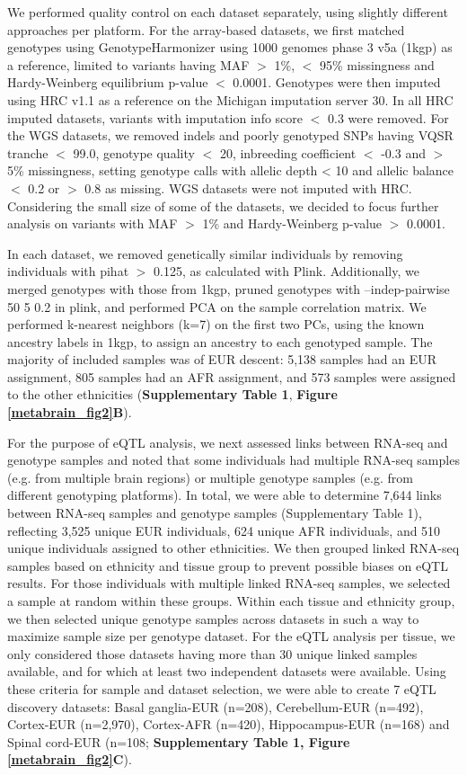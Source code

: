 We performed quality control on each dataset separately, using slightly different approaches per platform. For the array-based datasets, we first matched genotypes using GenotypeHarmonizer\cite{deelenGenotypeHarmonizerAutomatic2014} using 1000 genomes phase 3 v5a (1kgp) as a reference, limited to variants having MAF $>$ 1\%, $<$ 95\% missingness and Hardy-Weinberg equilibrium p-value $<$ 0.0001. Genotypes were then imputed using HRC v1.1 as a reference on the Michigan imputation server 30. In all HRC imputed datasets, variants with imputation info score $<$ 0.3 were removed. For the WGS datasets, we removed indels and poorly genotyped SNPs having VQSR tranche $<$ 99.0, genotype quality $<$ 20, inbreeding coefficient $<$ -0.3 and $>$ 5\% missingness, setting genotype calls with allelic depth < 10 and allelic balance $<$ 0.2 or $>$ 0.8 as missing. WGS datasets were not imputed with HRC. Considering the small size of some of the datasets, we decided to focus further analysis on variants with MAF $>$ 1\% and Hardy-Weinberg p-value $>$ 0.0001. 

In each dataset, we removed genetically similar individuals by removing individuals with pihat $>$ 0.125, as calculated with Plink. Additionally, we merged genotypes with those from 1kgp, pruned genotypes with --indep-pairwise 50 5 0.2 in plink, and performed PCA on the sample correlation matrix. We performed k-nearest neighbors (k=7) on the first two PCs, using the known ancestry labels in 1kgp, to assign an ancestry to each genotyped sample. The majority of included samples was of EUR descent: 5,138 samples had an EUR assignment, 805 samples had an AFR assignment, and 573 samples were assigned to the other ethnicities (\textbf{Supplementary Table 1}, \textbf{Figure \ref{metabrain_fig2}B}). 

For the purpose of eQTL analysis, we next assessed links between RNA-seq and genotype samples and noted that some individuals had multiple RNA-seq samples (e.g. from multiple brain regions) or multiple genotype samples (e.g. from different genotyping platforms). In total, we were able to determine 7,644 links between RNA-seq samples and genotype samples (Supplementary Table 1), reflecting 3,525 unique EUR individuals, 624 unique AFR individuals, and 510 unique individuals assigned to other ethnicities. We then grouped linked RNA-seq samples based on ethnicity and tissue group to prevent possible biases on eQTL results. For those individuals with multiple linked RNA-seq samples, we selected a sample at random within these groups. Within each tissue and ethnicity group, we then selected unique genotype samples across datasets in such a way to maximize sample size per genotype dataset. For the eQTL analysis per tissue, we only considered those datasets having more than 30 unique linked samples available, and for which at least two independent datasets were available. Using these criteria for sample and dataset selection, we were able to create 7 eQTL discovery datasets: Basal ganglia-EUR (n=208), Cerebellum-EUR (n=492), Cortex-EUR (n=2,970), Cortex-AFR (n=420), Hippocampus-EUR (n=168) and Spinal cord-EUR (n=108; \textbf{Supplementary Table 1, Figure \ref{metabrain_fig2}C}). 


